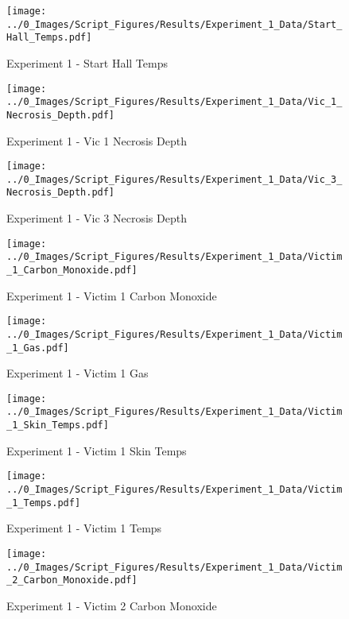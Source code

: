 	\begin{figure}[H]
		\centering
		\texttt{[image: ../0\_Images/Script\_Figures/Results/Experiment\_1\_Data/Start\_Hall\_Temps.pdf]}
		\caption[]{Experiment 1 - Start Hall Temps}
	\end{figure}
 
	\clearpage

	\begin{figure}[H]
		\centering
		\texttt{[image: ../0\_Images/Script\_Figures/Results/Experiment\_1\_Data/Vic\_1\_Necrosis\_Depth.pdf]}
		\caption[]{Experiment 1 - Vic 1 Necrosis Depth}
	\end{figure}
 

	\begin{figure}[H]
		\centering
		\texttt{[image: ../0\_Images/Script\_Figures/Results/Experiment\_1\_Data/Vic\_3\_Necrosis\_Depth.pdf]}
		\caption[]{Experiment 1 - Vic 3 Necrosis Depth}
	\end{figure}
 
	\clearpage

	\begin{figure}[H]
		\centering
		\texttt{[image: ../0\_Images/Script\_Figures/Results/Experiment\_1\_Data/Victim\_1\_Carbon\_Monoxide.pdf]}
		\caption[]{Experiment 1 - Victim 1 Carbon Monoxide}
	\end{figure}
 

	\begin{figure}[H]
		\centering
		\texttt{[image: ../0\_Images/Script\_Figures/Results/Experiment\_1\_Data/Victim\_1\_Gas.pdf]}
		\caption[]{Experiment 1 - Victim 1 Gas}
	\end{figure}
 
	\clearpage

	\begin{figure}[H]
		\centering
		\texttt{[image: ../0\_Images/Script\_Figures/Results/Experiment\_1\_Data/Victim\_1\_Skin\_Temps.pdf]}
		\caption[]{Experiment 1 - Victim 1 Skin Temps}
	\end{figure}
 

	\begin{figure}[H]
		\centering
		\texttt{[image: ../0\_Images/Script\_Figures/Results/Experiment\_1\_Data/Victim\_1\_Temps.pdf]}
		\caption[]{Experiment 1 - Victim 1 Temps}
	\end{figure}
 
	\clearpage

	\begin{figure}[H]
		\centering
		\texttt{[image: ../0\_Images/Script\_Figures/Results/Experiment\_1\_Data/Victim\_2\_Carbon\_Monoxide.pdf]}
		\caption[]{Experiment 1 - Victim 2 Carbon Monoxide}
	\end{figure}
 

